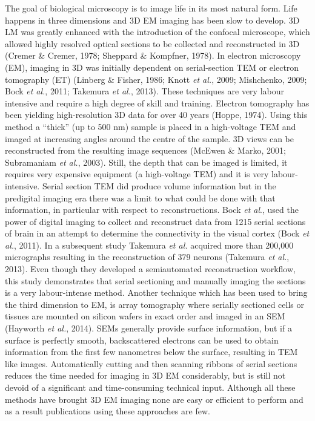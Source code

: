 \documentclass{article}
\begin{document}
The goal of biological microscopy is to image life in its most natural form. Life happens in three dimensions and 3D EM imaging has been slow to develop. 3D LM was greatly enhanced with the introduction of the confocal microscope, which allowed highly resolved optical sections to be collected and reconstructed in 3D (Cremer \& Cremer, 1978; Sheppard \& Kompfner, 1978). In electron microscopy (EM), imaging in 3D was initially dependent on serial-section TEM or electron tomography (ET) (Linberg \& Fisher, 1986; Knott \textit{et al.}, 2009; Mishchenko, 2009; Bock \textit{et al.}, 2011; Takemura \textit{et al.}, 2013). These techniques are very labour intensive and require a high degree of skill and training. Electron tomography has been yielding high-resolution 3D data for over 40 years (Hoppe, 1974). Using this method a “thick” (up to 500 nm) sample is placed in a high-voltage TEM and imaged at increasing angles around the centre of the sample. 3D views can be reconstructed from the resulting image sequences (McEwen \& Marko, 2001; Subramaniam \textit{et al.}, 2003). Still, the depth that can be imaged is limited, it requires very expensive equipment (a high-voltage TEM) and it is very labour-intensive. Serial section TEM did produce volume information but in the predigital imaging era there was a limit to what could be done with that information, in particular with respect to reconstructions. Bock \textit{et al}., used the power of digital imaging to collect and reconstruct data from 1215 serial sections of brain in an attempt to determine the connectivity in the visual cortex (Bock \textit{et al.}, 2011). In a subsequent study Takemura \textit{et al.} acquired more than 200,000 micrographs resulting in the reconstruction of 379 neurons (Takemura \textit{et al.}, 2013). Even though they developed a semiautomated reconstruction workflow, this study demonstrates that serial sectioning and manually imaging the sections is a very labour-intense method. Another technique which has been used to bring the third dimension to EM, is array tomography where serially sectioned cells or tissues are mounted on silicon wafers in exact order and imaged in an SEM (Hayworth \textit{et al.}, 2014). SEMs generally provide surface information, but if a surface is perfectly smooth, backscattered electrons can be used to obtain information from the first few nanometres below the surface, resulting in TEM like images. Automatically cutting and then scanning ribbons of serial sections reduces the time needed for imaging in 3D EM considerably, but is still not devoid of a significant and time-consuming technical input. Although all these methods have brought 3D EM imaging none are easy or efficient to perform and as a result publications using these approaches are few.
\end{document}
